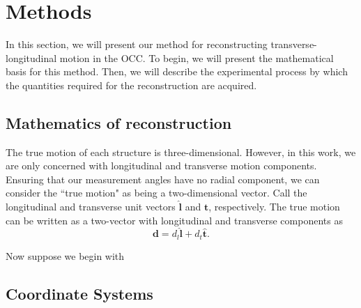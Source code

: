 \documentclass[preprint,NumberedRefs]{JASA}
\begin{document}
\section{Methods}
\par{In this section, we will present our method for reconstructing transverse-longitudinal motion in the OCC. To begin, we will present the mathematical basis for this method. Then, we will describe the experimental process by which the quantities required for the reconstruction are acquired.}
\subsection{Mathematics of reconstruction}
\par{The true motion of each structure is three-dimensional. However, in this work, we are only concerned with longitudinal and transverse motion components. Ensuring that our measurement angles have no radial component, we can consider the ``true motion" as being a two-dimensional vector. Call the longitudinal and transverse unit vectors $\mathbf{\hat{l}}$ and $\mathbf{\hat{t}}$, respectively. The true motion can be written as a two-vector with longitudinal and transverse components as 
\begin{equation}
    \mathbf{d} = d_l \mathbf{\hat{l}} + d_t \mathbf{\hat{t}}.
\end{equation}
}
\par{Now suppose we begin with }

\subsection{Coordinate Systems}
\end{document}
